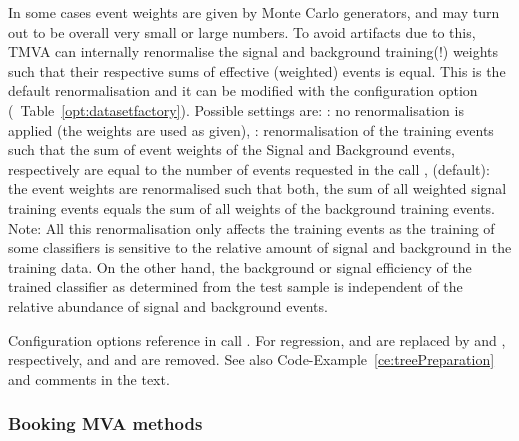 In some cases event weights are given by Monte Carlo generators, and
may turn out to be overall very small or large numbers. To avoid
artifacts due to this, TMVA can internally renormalise the signal and
background training(!) weights such that their respective sums of
effective (weighted) events is equal. This is the default
renormalisation and it can be modified with the configuration option
 (\cf\ Table~\ref{opt:datasetfactory}).  Possible
settings are: : no renormalisation is applied (the weights
are used as given),  : renormalisation of the training
events such that the sum of event weights of the Signal and Background
events, respectively are equal to the number of events 
requested in the call
,
 (default): the event weights are renormalised such
that both, the sum of all weighted signal training events equals the
sum of all weights of the background training events. Note: All this renormalisation only
affects the training events as the training of some classifiers is sensitive to the
relative amount of signal and background in the training data. On the other hand, the 
background or signal efficiency of the trained classifier as determined from the test
sample is independent of the relative abundance of signal and background events.

\begin{option}[p]

\caption[.]{\optionCaptionSize Configuration options reference in call
  .  For regression,
   and  are replaced by
   and , respectively,
  and  and  are
  removed.  See also Code-Example~\ref{ce:treePreparation} and
  comments in the text.  }
\label{opt:datasetfactory}
\end{option}
\clearpage
\subsubsection{Booking MVA methods}
\label{sec:usingtmva:booking}

